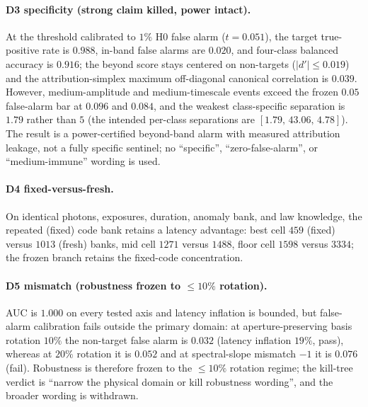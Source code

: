 \documentclass[aps,prl,onecolumn,notitlepage,nofootinbib,superscriptaddress]{revtex4-2}
\begin{document}
\paragraph*{D3 specificity (strong claim killed, power intact).}
At the threshold calibrated to $1\%$ H0 false alarm ($t=0.051$), the target
true-positive rate is $0.988$, in-band false alarms are $0.020$, and four-class
balanced accuracy is $0.916$; the beyond score stays centered on non-targets
($|d'|\le0.019$) and the attribution-simplex maximum off-diagonal canonical
correlation is $0.039$. However, medium-amplitude and medium-timescale events
exceed the frozen $0.05$ false-alarm bar at $0.096$ and $0.084$, and the weakest
class-specific separation is $1.79$ rather than $5$ (the intended per-class
separations are $[1.79,\,43.06,\,4.78]$). The result is a power-certified
beyond-band alarm with measured attribution leakage, not a fully specific
sentinel; no ``specific'', ``zero-false-alarm'', or ``medium-immune'' wording is
used.

\paragraph*{D4 fixed-versus-fresh.}
On identical photons, exposures, duration, anomaly bank, and law knowledge, the
repeated (fixed) code bank retains a latency advantage: best cell $459$ (fixed)
versus $1013$ (fresh) banks, mid cell $1271$ versus $1488$, floor cell $1598$
versus $3334$; the frozen branch retains the fixed-code concentration.

\paragraph*{D5 mismatch (robustness frozen to $\le10\%$ rotation).}
AUC is $1.000$ on every tested axis and latency inflation is bounded, but
false-alarm calibration fails outside the primary domain: at aperture-preserving
basis rotation $10\%$ the non-target false alarm is $0.032$ (latency inflation
$19\%$, pass), whereas at $20\%$ rotation it is $0.052$ and at spectral-slope
mismatch $-1$ it is $0.076$ (fail). Robustness is therefore frozen to the
$\le10\%$ rotation regime; the kill-tree verdict is ``narrow the physical domain
or kill robustness wording'', and the broader wording is withdrawn.
\end{document}
